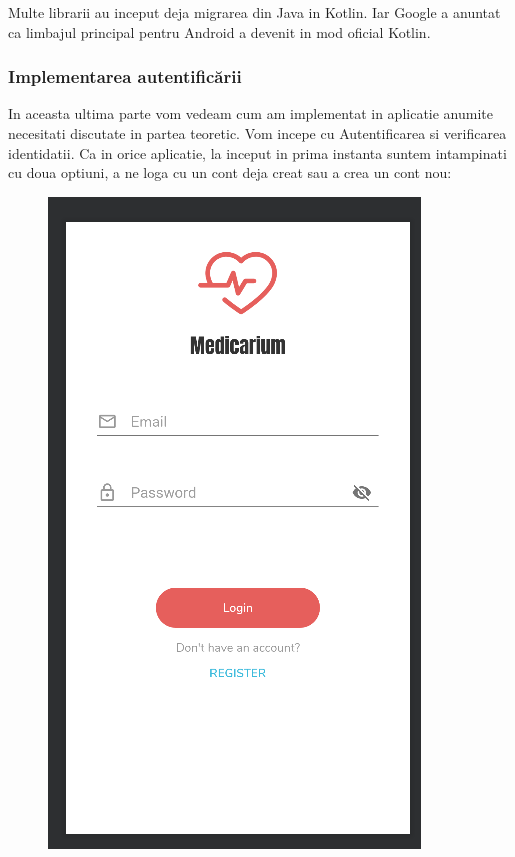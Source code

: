 \documentclass[12pt]{article}
\begin{document}
Multe librarii au inceput deja migrarea din Java in Kotlin. Iar Google a anuntat ca limbajul principal
pentru Android a devenit in mod oficial Kotlin.

\newpage
\subsubsection{Implementarea autentificării}

In aceasta ultima parte vom vedeam cum am implementat in aplicatie anumite necesitati
discutate in partea teoretic.
Vom incepe cu Autentificarea si verificarea identidatii. Ca in orice aplicatie, la inceput
in prima instanta suntem intampinati cu doua optiuni, a ne loga cu un cont deja creat sau a
crea un cont nou:

\begin{figure}[H]
    \centering
    \begin{minipage}[b]{0.4\textwidth}
      \includegraphics[width=\textwidth]{login.png}

\end{minipage}
\end{figure}
\end{document}
